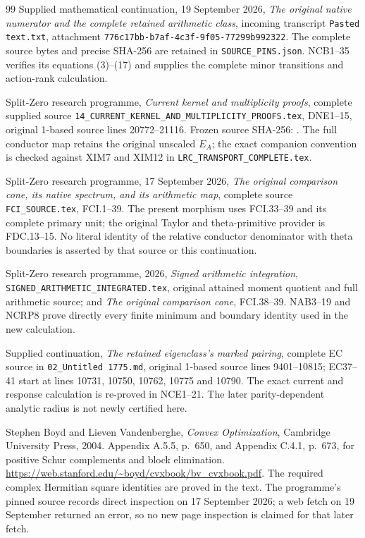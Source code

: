 \begin{thebibliography}{99}
Supplied mathematical continuation, 19 September 2026,
\emph{The original native numerator and the complete retained arithmetic class},
incoming transcript \texttt{Pasted text.txt}, attachment
\texttt{776c17bb-b7af-4c3f-9f05-77299b992322}.
The complete source bytes and precise SHA-256 are retained in
\texttt{SOURCE\_PINS.json}. NCB1--35 verifies its equations (3)--(17)
and supplies the complete minor transitions and action-rank calculation.

Split-Zero research programme, \emph{Current kernel and multiplicity proofs},
complete supplied source \texttt{14\_CURRENT\_KERNEL\_AND\_MULTIPLICITY\_PROOFS.tex},
DNE1--15, original 1-based source lines 20772--21116.
Frozen source SHA-256:
.
The full conductor map retains the original unscaled $E_A$;
the exact companion convention is checked against XIM7 and XIM12
in \texttt{LRC\_TRANSPORT\_COMPLETE.tex}.

Split-Zero research programme, 17 September 2026,
\emph{The original comparison cone, its native spectrum, and its arithmetic map},
complete source \texttt{FCI\_SOURCE.tex}, FCI.1--39.
The present morphism uses FCI.33--39 and its complete primary unit;
the original Taylor and theta-primitive provider is FDC.13--15.
No literal identity of the relative conductor denominator with theta
boundaries is asserted by that source or this continuation.

Split-Zero research programme, 2026,
\emph{Signed arithmetic integration},
\texttt{SIGNED\_ARITHMETIC\_INTEGRATED.tex}, original attained
moment quotient and full arithmetic source;
and \emph{The original comparison cone}, FCI.38--39.
NAB3--19 and NCRP8 prove directly every finite minimum and boundary
identity used in the new calculation.

Supplied continuation, \emph{The retained eigenclass's marked pairing},
complete EC source in \texttt{02\_Untitled 1775.md},
original 1-based source lines 9401--10815;
EC37--41 start at lines 10731, 10750, 10762, 10775 and 10790.
The exact current and response calculation is re-proved in NCE1--21.
The later parity-dependent analytic radius is not newly certified here.

Stephen Boyd and Lieven Vandenberghe,
\emph{Convex Optimization}, Cambridge University Press, 2004.
Appendix A.5.5, p.~650, and Appendix C.4.1, p.~673,
for positive Schur complements and block elimination.
\url{https://web.stanford.edu/~boyd/cvxbook/bv_cvxbook.pdf}.
The required complex Hermitian square identities are proved in the text.
The programme's pinned source records direct inspection on
17 September 2026; a web fetch on 19 September returned an error,
so no new page inspection is claimed for that later fetch.


\end{thebibliography}
